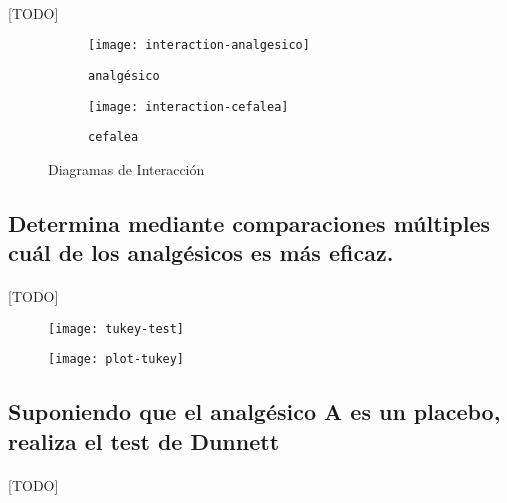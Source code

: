 \documentclass[11pt]{article}
\begin{document}
      \paragraph{}
      [TODO]

      \begin{figure}[H]
        \centering
        \begin{subfigure}{.5\textwidth}
          \centering
          \texttt{[image: interaction-analgesico]}
          \caption{\texttt{analgésico}}
          \label{fig:sub1}
        \end{subfigure}%
        \begin{subfigure}{.5\textwidth}
          \centering
          \texttt{[image: interaction-cefalea]}
          \caption{\texttt{cefalea}}
          \label{fig:sub2}
        \end{subfigure}
        \caption{Diagramas de Interacción}
        \label{fig:test}
      \end{figure}


    \subsection{Determina mediante comparaciones múltiples cuál de los analgésicos es más eficaz.}

      \paragraph{}
      [TODO]

      \begin{figure}[H]
        \centering
        \texttt{[image: tukey-test]}
        \caption{}
        \label{}
      \end{figure}

      \begin{figure}[H]
        \centering
        \texttt{[image: plot-tukey]}
        \caption{}
        \label{}
      \end{figure}

    \subsection{Suponiendo que el analgésico A es un placebo, realiza el test de Dunnett}

      \paragraph{}
      [TODO]
\end{document}
